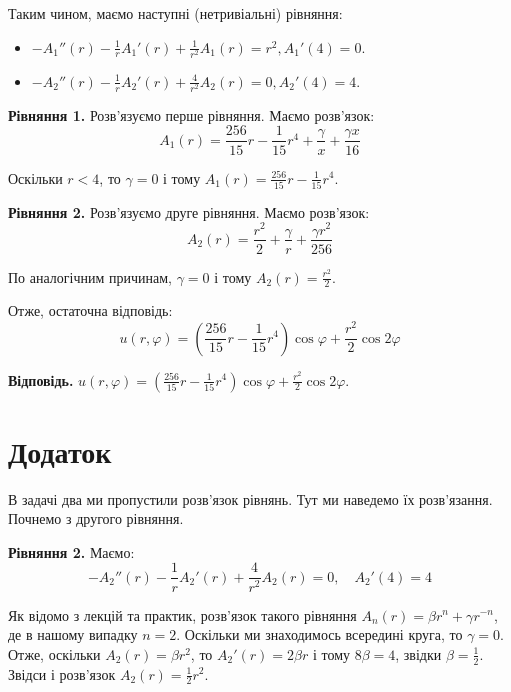 \documentclass{hw_template}
\begin{document}
Таким чином, маємо наступні (нетривіальні) рівняння:
\begin{itemize}
    \item $-A_1''(r)-\frac{1}{r}A_1'(r)+\frac{1}{r^2}A_1(r)=r^2, A_1'(4)=0$.
    \item $-A_2''(r)-\frac{1}{r}A_2'(r)+\frac{4}{r^2}A_2(r)=0, A_2'(4)=4$.
\end{itemize}

\textbf{Рівняння 1.} Розв'язуємо перше рівняння. Маємо розв'язок:
\begin{equation*}
    A_1(r) = \frac{256}{15}r - \frac{1}{15}r^4 + \frac{\gamma}{x} + \frac{\gamma x}{16}
\end{equation*}

Оскільки $r<4$, то $\gamma=0$ і тому $A_1(r) = \frac{256}{15}r - \frac{1}{15}r^4$.

\textbf{Рівняння 2.} Розв'язуємо друге рівняння. Маємо розв'язок:
\begin{equation*}
    A_2(r) = \frac{r^2}{2} + \frac{\gamma}{r} + \frac{\gamma r^2}{256}
\end{equation*}

По аналогічним причинам, $\gamma=0$ і тому $A_2(r) = \frac{r^2}{2}$.

Отже, остаточна відповідь:
\begin{equation*}
    \boxed{u(r,\varphi) = \left(\frac{256}{15}r - \frac{1}{15}r^4\right)\cos\varphi + \frac{r^2}{2}\cos 2\varphi}
\end{equation*}

\textbf{Відповідь.} $u(r,\varphi) = \left(\frac{256}{15}r - \frac{1}{15}r^4\right)\cos\varphi + \frac{r^2}{2}\cos 2\varphi$.

\section{Додаток}

В задачі два ми пропустили розв'язок рівнянь. Тут ми наведемо їх розв'язання.
Почнемо з другого рівняння.

\textbf{Рівняння 2.} Маємо:
\begin{equation*}
    -A_2''(r)-\frac{1}{r}A_2'(r)+\frac{4}{r^2}A_2(r)=0, \quad A_2'(4)=4
\end{equation*}

Як відомо з лекцій та практик, розв'язок такого рівняння $A_n(r) = \beta r^n + \gamma r^{-n}$, де в нашому випадку $n=2$. Оскільки ми знаходимось всередині круга, то $\gamma=0$. Отже, оскільки
$A_2(r) = \beta r^2$, то $A_2'(r)=2\beta r$ і тому $8\beta = 4$, звідки $\beta=\frac{1}{2}$. Звідси і розв'язок $A_2(r)=\frac{1}{2}r^2$.
\end{document}
